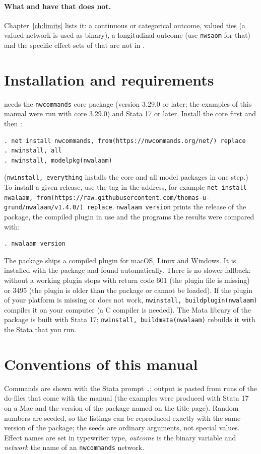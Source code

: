 \paragraph{What \alaamee{} and \mpnet{} have that \nwalaam{} does not.} Chapter~\ref{ch:limits} lists it: a continuous or categorical outcome, valued ties (a valued network is used as binary), a longitudinal outcome (use \texttt{nwsaom} for that) and the specific effect sets of \mpnet{} that are not in \alaamee{}.

\section{Installation and requirements}\label{sec:install}

\nwalaam{} needs the \texttt{nwcommands} core package (version 3.29.0 or later; the examples of this manual were run with core 3.29.0) and Stata 17 or later. Install the core first and then \nwalaam{}:
\begin{lstlisting}
. net install nwcommands, from(https://nwcommands.org/net/) replace
. nwinstall, all
. nwinstall, modelpkg(nwalaam)
\end{lstlisting}
(\texttt{nwinstall, everything} installs the core and all model packages in one step.) To install a given release, use the tag in the address, for example \texttt{net install nwalaam, from(https://raw.githubusercontent.com/thomas-u-grund/nwalaam/v1.4.0/) replace}. \texttt{nwalaam version} prints the release of the package, the compiled plugin in use and the programs the results were compared with:
\begin{lstlisting}
. nwalaam version
\end{lstlisting}
The package ships a compiled plugin for macOS, Linux and Windows. It is installed with the package and found automatically. There is no slower fallback: without a working plugin \nwalaam{} stops with return code 601 (the plugin file is missing) or 3495 (the plugin is older than the package or cannot be loaded). If the plugin of your platform is missing or does not work, \texttt{nwinstall, buildplugin(nwalaam)} compiles it on your computer (a C compiler is needed). The Mata library of the package is built with Stata 17; \texttt{nwinstall, buildmata(nwalaam)} rebuilds it with the Stata that you run.

\section{Conventions of this manual}

Commands are shown with the Stata prompt \texttt{.}; output is pasted from runs of the do-files that come with the manual (the examples were produced with Stata 17 on a Mac and the version of the package named on the title page). Random numbers are seeded, so the listings can be reproduced exactly with the same version of the package; the seeds are ordinary arguments, not special values. Effect names are set in typewriter type, \emph{outcome} is the binary variable and \emph{network} the name of an \texttt{nwcommands} network.
